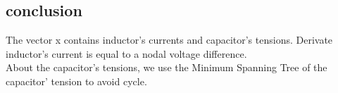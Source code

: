 \subsection{conclusion}
The vector x contains inductor's currents and capacitor's tensions. Derivate inductor's current is equal to a
nodal voltage difference.\\
About the capacitor's tensions, we use the Minimum Spanning Tree of the capacitor' tension to avoid cycle.\\



